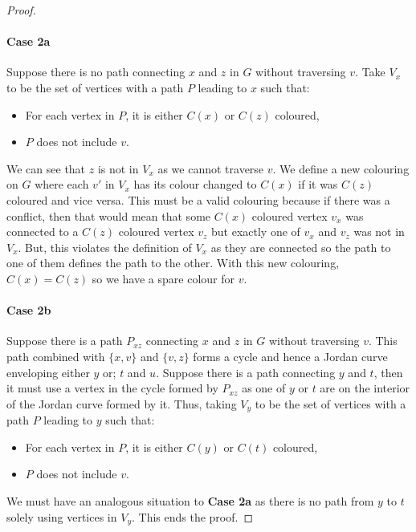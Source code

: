 \begin{proof}
    \paragraph{Case 2a} 
    Suppose there is no path connecting $x$ and $z$ in $G$ without traversing $v$.
    Take $V_{x}$ to be the set of vertices with a path $P$ leading to $x$
    such that: \begin{itemize}
        \item For each vertex in $P$, it is either $C(x)$ or $C(z)$ coloured,
        \item $P$ does not include $v$.
    \end{itemize} We can see that $z$ is not in $V_x$ as we cannot traverse $v$.
    We define a new colouring on $G$ where each $v'$ in $V_x$ has its colour changed
    to $C(x)$ if it was $C(z)$ coloured and vice versa. This must be a valid
    colouring because if there was a conflict, then that would mean that some
    $C(x)$ coloured vertex $v_x$ was connected to a $C(z)$ coloured vertex $v_z$
    but exactly one of $v_x$ and $v_z$ was not in $V_x$. But, this violates the 
    definition of $V_x$ as they are connected so the path to one of them
    defines the path to the other. With this new colouring, $C(x) = C(z)$
    so we have a spare colour for $v$.
        
    \paragraph{Case 2b} 
    Suppose there is a path $P_{xz}$ connecting $x$ and $z$ in $G$ without traversing $v$.
    This path combined with $\{x, v\}$ and $\{v, z\}$ forms a cycle and hence a Jordan curve
    enveloping either $y$ or; $t$ and $u$. Suppose there is a path connecting $y$ and $t$, 
    then it must use a vertex in the cycle formed by $P_{xz}$ as one of $y$ or $t$ are
    on the interior of the Jordan curve formed by it. Thus, taking $V_{y}$ to be the 
    set of vertices with a path $P$ leading to $y$ such that: \begin{itemize}
        \item For each vertex in $P$, it is either $C(y)$ or $C(t)$ coloured,
        \item $P$ does not include $v$.
    \end{itemize} We must have an analogous situation to \textbf{Case 2a} as there
    is no path from $y$ to $t$ solely using vertices in $V_y$. This ends the proof.
\end{proof}
